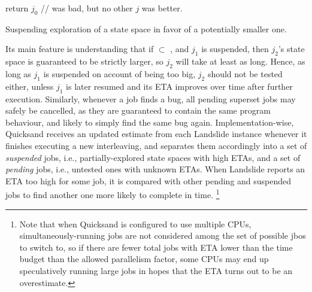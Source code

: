 \begin{algorithm}[t]
	return $j_0$ //  was bad, but no other $j$ was better.
	\caption{Suspending exploration of a state space in favor of a potentially smaller one.}
	\label{alg:shouldworkblock}
\end{algorithm}

Its main feature is understanding that if  $\subset$ ,
and $j_1$ is suspended,
then $j_2$'s state space is guaranteed to be strictly larger, so $j_2$ will take at least as long.
Hence, as long as $j_1$ is suspended on account of being too big,
$j_2$ should not be tested either,
unless $j_1$ is later resumed and its ETA improves over time after further execution.
Similarly, whenever a job finds a bug, all pending superset jobs may safely be cancelled,
as they are guaranteed to contain the same program behaviour, and likely to simply find the same bug again.
%
Implementation-wise,
Quicksand receives an updated estimate from each Landslide instance whenever it finishes executing a new interleaving,
and separates them accordingly
into a set of {\em suspended} jobs,
i.e., partially-explored state spaces with high ETAs,
and a set of {\em pending} jobs,
i.e., untested ones with unknown ETAs.
When Landslide reports an ETA too high for some job,
it is compared with other pending and suspended jobs to find another one more likely to complete in time.%
\footnote{Note that when Quicksand is configured to use multiple CPUs,
simultaneously-running jobs are not considered among the set of possible jbos to switch to,
so if there are fewer total jobs with ETA lower than the time budget than the allowed parallelism factor,
some CPUs may end up speculatively running large jobs
in hopes that the ETA turns out to be an overestimate.}

